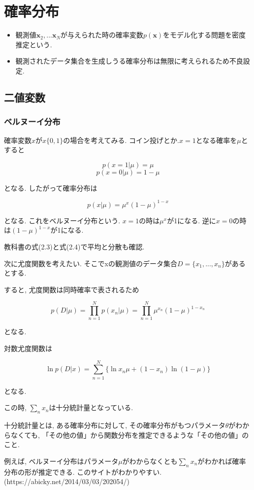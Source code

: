 \chapter{確率分布}

\begin{itemize}
    \item 観測値$\bm{x}_2, ... \bm{x}_N$が与えられた時の確率変数$p(\bm{x})$をモデル化する問題を密度推定という.
    \item 観測されたデータ集合を生成しうる確率分布は無限に考えられるため不良設定.
\end{itemize}

\section{二値変数}

\subsection{ベルヌーイ分布}
確率変数$x$が$x \{0, 1\}$の場合を考えてみる. コイン投げとか.$x=1$となる確率を$\mu$とすると

$$p(x=1|\mu) = \mu$$
$$p(x=0|\mu) = 1 - \mu$$

となる. したがって確率分布は

$$p(x|\mu) = \mu^x(1-\mu)^{1-x}$$

となる. これをベルヌーイ分布という.
$x=1$の時は$\mu^x$が1になる. 逆に$x=0$の時は$(1-\mu)^{1-x}$が1になる.

教科書の式(2.3)と式(2.4)で平均と分散も確認.

次に尤度関数を考えたい. そこでxの観測値のデータ集合$D = \{x_1, ..., x_n\}$があるとする.

すると, 尤度関数は同時確率で表されるため

$$p(D|\mu) = \prod_{n=1}^{N}p(x_n|\mu) = \prod_{n=1}^{N}\mu^{x_n}(1-\mu)^{1-x_n}$$

となる.

対数尤度関数は

$$\ln p(D|x) = \sum_{n=1}^{N} \{\ln x_n\mu + (1-x_n)\ln (1-\mu) \}$$

となる.

この時, $\sum_n x_n$は十分統計量となっている.

十分統計量とは, ある確率分布に対して, その確率分布がもつパラメータ$\theta$がわからなくても, 「その他の値」から関数分布を推定できるような「その他の値」のこと.

例えば, ベルヌーイ分布はパラメータ$\mu$がわからなくとも$\sum_{n} x_n$がわかれば確率分布の形が推定できる.
このサイトがわかりやすい. (https://abicky.net/2014/03/03/202054/)

